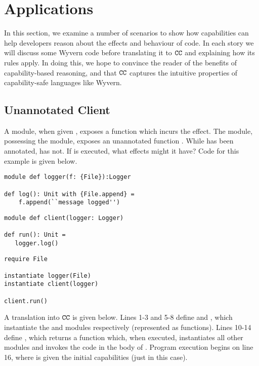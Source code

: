 \vspace{-0.5cm}
\section{Applications}
\vspace{-0.3cm}
\label{s:app}

In this section, we examine a number of scenarios to show how capabilities can help
developers reason about the effects and behaviour of code. In each story we will
discuss some Wyvern code before translating it to $\mathtt{CC}$ and explaining how its
rules apply. In doing this, we hope to convince the reader of the benefits of
capability-based reasoning, and that $\mathtt{CC}$ captures the intuitive properties of
capability-safe languages like Wyvern.

\vspace{-0.5cm}
\subsection{Unannotated Client}
\vspace{-0.2cm}

A  module, when given , exposes a  function
which incurs the  effect. The  module, possessing the
 module, exposes an unannotated function . While
 has been annotated,  has not. If  is
executed, what effects might it have? Code for this example is given below. 

\begin{lstlisting}
module def logger(f: {File}):Logger

def log(): Unit with {File.append} =
    f.append(``message logged'')
\end{lstlisting}

\begin{lstlisting}
module def client(logger: Logger)

def run(): Unit =
   logger.log()
\end{lstlisting}

\begin{lstlisting}
require File

instantiate logger(File)
instantiate client(logger)

client.run()
\end{lstlisting}

A translation into $\mathtt{CC}$ is given below. Lines 1-3 and 5-8 define
 and , which instantiate the  and
 modules respectively (represented as functions). Lines 10-14 define
, which returns a function which, when executed, instantiates all
other modules and invokes the code in the body of . Program execution
begins on line 16, where  is given the initial capabilities (just 
in this case).

